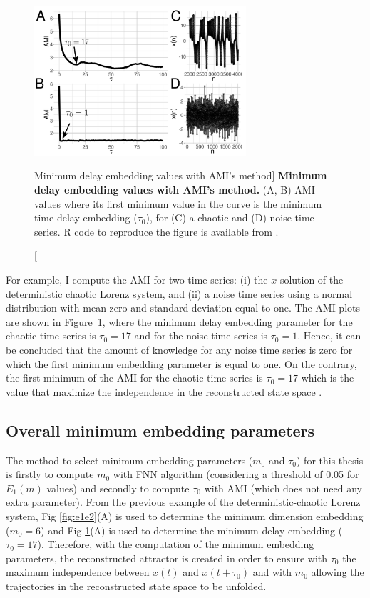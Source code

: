 \begin{figure}[!h]
  \centering
  \includegraphics[width=0.7\textwidth]{ami}
    \caption
	[Minimum delay embedding values with AMI's method]{
	{\bf Minimum delay embedding values with AMI's method.} 
    	(A, B) AMI values where its first minimum value in the curve
	is the minimum time delay embedding ($\tau_0$), 
	for (C) a chaotic and (D) noise time series.
	R code to reproduce the figure is available from \cite{hwum2018}.
        }
    \label{fig:amis}
\end{figure}
For example, I compute the AMI for two time series:
(i) the $x$ solution of the deterministic chaotic Lorenz system, and 
(ii) a noise time series using a normal distribution with mean zero and 
standard deviation equal to one. The AMI plots are shown in 
Figure~\ref{fig:amis}, where the minimum delay embedding parameter for 
the chaotic time series is $\tau_0=17$ and for the noise time series is  
$\tau_0=1$. Hence, it can be concluded that the amount of knowledge for 
any noise time series is zero for which the first minimum embedding 
parameter is equal to one. On the contrary, the first minimum of the AMI 
for the chaotic time series is $\tau_0=17$ which is the value that maximize 
the independence in the reconstructed state space \citep{bradley2015}.

\subsection{Overall minimum embedding parameters} \label{sec:overall_minMT}
The method to select minimum embedding parameters ($m_0$ and $\tau_0$) 
for this thesis is firstly to compute $m_0$ with FNN algorithm 
(considering a threshold of 0.05 for $E_1(m)$ values) and secondly
to compute $\tau_0$ with AMI (which does not need any extra parameter).
From the previous example of the deterministic-chaotic 
Lorenz system, Fig \ref{fig:e1e2}(A) is used to determine 
the minimum dimension embedding ($m_0 =6$) and 
Fig \ref{fig:amis}(A) is used to determine the minimum delay embedding 
($\tau_0 =17$).
Therefore, with the computation of the minimum embedding parameters, the 
reconstructed attractor is created in order to ensure with $\tau_0$ the 
maximum independence between $x(t)$ and $x(t+\tau_0)$ and with $m_0$ 
allowing the trajectories in the reconstructed state space to be unfolded.

